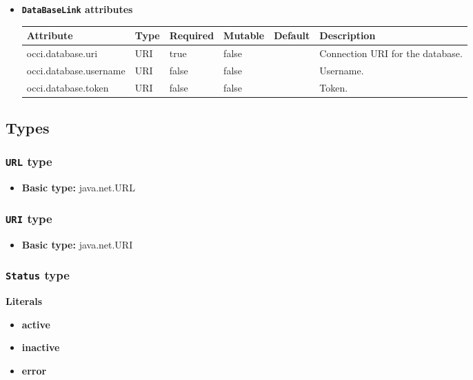 \begin{itemize}
\item \textbf{\texttt{DataBaseLink} attributes}

\begin{tabularx}{\textwidth}{|l|l|p{1.4cm}|p{1.3cm}|l|X|}
  \hline
  \textbf{Attribute} & \textbf{Type} & \textbf{Required} & \textbf{Mutable} & \textbf{Default} & \textbf{Description} \\
  \hline  
  occi.database.uri & URI & true & false &  & Connection URI for the database. \\
  \hline
  occi.database.username & URI & false & false &  & Username. \\
  \hline
  occi.database.token & URI & false & false &  & Token. \\
  \hline
\end{tabularx}
\end{itemize}


\subsection{Types}
\subsubsection{\texttt{URL} type}

\begin{itemize}
\item \textbf{Basic type:} java.net.URL
\end{itemize}
\subsubsection{\texttt{URI} type}

\begin{itemize}
\item \textbf{Basic type:} java.net.URI
\end{itemize}
\subsubsection{\texttt{Status} type}

\textbf{Literals}
\begin{itemize}
\item \textbf{active} 
\end{itemize}
\begin{itemize}
\item \textbf{inactive} 
\end{itemize}
\begin{itemize}
\item \textbf{error} 
\end{itemize}


